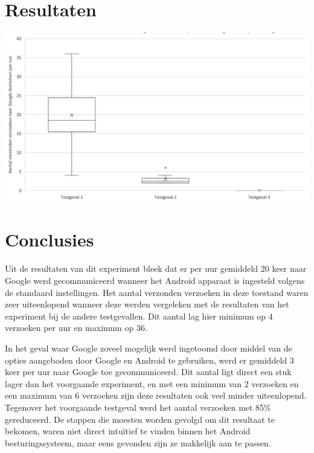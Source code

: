 \documentclass[a0,portrait]{a0poster}
\begin{document}
\begin{multicols}{2}
\vfill\null
\columnbreak

\color{HoGentAccent1} 
\section*{Resultaten}
\color{black}


\begin{center}\vspace{1cm}
\includegraphics[width=1.0\linewidth]{../bachproef/experiment/grafieken/boxplot-compare-wide.png}
\end{center}\vspace{1cm}


\color{HoGentAccent1} 
\section*{Conclusies}
\color{black}
Uit de resultaten van dit experiment bleek dat er per uur gemiddeld 20 keer naar Google werd gecommuniceerd wanneer het Android apparaat is ingesteld volgens de standaard instellingen. Het aantal verzonden verzoeken in deze toestand waren zeer uiteenlopend wanneer deze werden vergeleken met de resultaten van het experiment bij de andere testgevallen. Dit aantal lag hier minimum op 4 verzoeken per uur en maximum op 36.

In het geval waar Google zoveel mogelijk werd ingetoomd door middel van de opties aangeboden door Google en Android te gebruiken, werd er gemiddeld 3 keer per uur naar Google toe gecommuniceerd. Dit aantal ligt direct een stuk lager dan het voorgaande experiment, en met een minimum van 2 verzoeken en een maximum van 6 verzoeken zijn deze resultaten ook veel minder uiteenlopend. Tegenover het voorgaande testgeval werd het aantal verzoeken met 85\% gereduceerd. De stappen die moesten worden gevolgd om dit resultaat te bekomen, waren niet direct intuïtief te vinden binnen het Android besturingssysteem, maar eens gevonden zijn ze makkelijk aan te passen.


\end{multicols}
\end{document}
